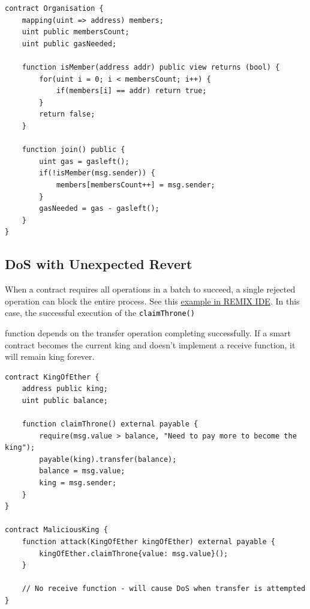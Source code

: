 \documentclass[12pt]{article}
\newcommand{\codegrey}[1]{%
  \texttt{\colorbox{black!4}{\textcolor{black}{#1}}}%
}
\begin{document}
\noindent
\begin{minipage}{\textwidth}
    \begin{lstlisting}[language=Solidity, caption=DoS with Block Gas Limit Example]
contract Organisation {
    mapping(uint => address) members;
    uint public membersCount;
    uint public gasNeeded;

    function isMember(address addr) public view returns (bool) {
        for(uint i = 0; i < membersCount; i++) {
            if(members[i] == addr) return true;
        }
        return false;
    }

    function join() public {
        uint gas = gasleft();
        if(!isMember(msg.sender)) {
            members[membersCount++] = msg.sender;
        }
        gasNeeded = gas - gasleft();
    }
}
\end{lstlisting}
\end{minipage}

\subsection{DoS with Unexpected Revert}

When a contract requires all operations in a batch to succeed, a single
rejected operation can block the entire process. See this
\href{https://remix.ethereum.org/?#activate=solidity&url=https://github.com/radovluk/unbreakable-vault/contracts/DoS02.sol&lang=en&optimize=false&runs=200&evmVersion=null&version=soljson-v0.8.28+commit.7893614a.js}{example
    in REMIX IDE}. In this case, the successful execution of the \codegrey{claimThrone()}
function depends on the transfer operation completing successfully. If a smart
contract becomes the current king and doesn't implement a receive function, it
will remain king forever.

\noindent
\begin{minipage}{\textwidth}
    \begin{lstlisting}[language=Solidity, caption=DoS with Revert Example]
contract KingOfEther {
    address public king;
    uint public balance;

    function claimThrone() external payable {
        require(msg.value > balance, "Need to pay more to become the king");
        payable(king).transfer(balance);
        balance = msg.value;
        king = msg.sender;
    }
}

contract MaliciousKing {    
    function attack(KingOfEther kingOfEther) external payable {
        kingOfEther.claimThrone{value: msg.value}();
    }

    // No receive function - will cause DoS when transfer is attempted
}
\end{lstlisting}
\end{minipage}
\end{document}
